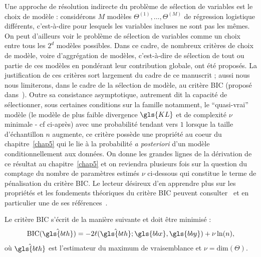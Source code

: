 Une approche de résolution indirecte du problème de sélection de variables est le choix de modèle : considérons $M$ modèles $\Theta^{(1)},\dots,\Theta^{(M)}$ de régression logistique différents, c'est-à-dire pour lesquels les variables incluses ne sont pas les mêmes. On peut d'ailleurs voir le problème de sélection de variables comme un choix entre tous les $2^d$ modèles possibles. Dans ce cadre, de nombreux critères de choix de modèle, voire d'aggrégation de modèles, c'est-à-dire de sélection de tout ou partie de ces modèles en pondérant leur contribution globale, ont été proposés. La justification de ces critères sort largement du cadre de ce manuscrit ; aussi nous nous limiterons, dans le cadre de la sélection de modèle, au critère BIC (proposé dans~\cite{BIC}). Outre sa consistance asymptotique, autrement dit la capacité de sélectionner, sous certaines conditions sur la famille notamment, le ``quasi-vrai'' modèle (le modèle de plus faible divergence $\gls{KL}$ et de complexité $\nu$ minimale - cf ci-après) avec une probabilité tendant vers $1$ lorsque la taille d'échantillon $n$ augmente, ce critère possède une propriété au coeur du chapitre~\ref{chap5} qui le lie à la probabilité \textit{a posteriori} d'un modèle conditionnellement aux données. On donne les grandes lignes de la dérivation de ce résultat au chapitre~\ref{chap5} et on reviendra plusieurs fois sur la question du comptage du nombre de paramètres estimés $\nu$ ci-dessous qui constitue le terme de pénalisation du critère BIC. Le lecteur désireux d'en apprendre plus sur les propriétés et les fondements théoriques du critère BIC peuvent consulter~\cite{lebarbier} et en particulier une de ses références~\cite{burnham2003model}.

Le critère BIC s'écrit de la manière suivante et doit être minimisé :
\begin{equation}
    \label{eq:BIC}
    \text{BIC}(\hat{\gls{bth}}) =  -2 \ell(\hat{\gls{bth}} ; \gls{bbx},\gls{bby}) + \nu \ln (n),
\end{equation}
où $\hat{\gls{bth}}$ est l'estimateur du maximum de vraisemblance et $\nu = \text{dim}(\Theta)$.


%
%
%
%
%


